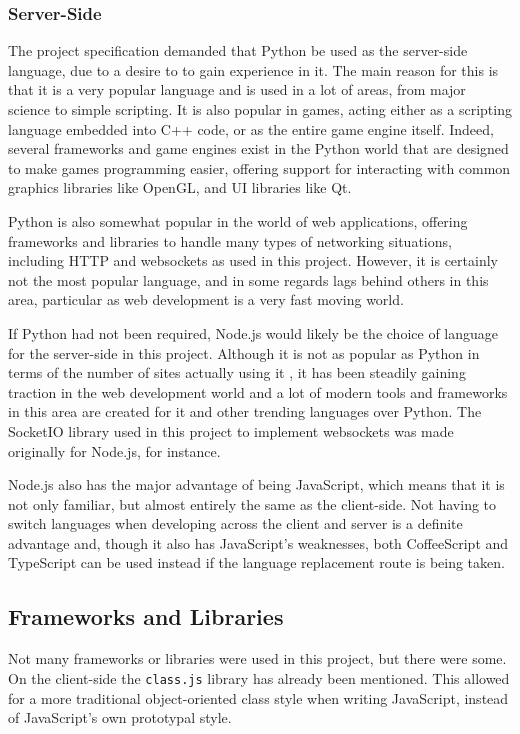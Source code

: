 \subsubsection{Server-Side}
The project specification demanded that Python be used as the server-side language, due to a desire to to gain experience in it. The main reason for this is that it is a very popular language and is used in a lot of areas, from major science to simple scripting. It is also popular in games, acting either as a scripting language embedded into C++ code, or as the entire game engine itself. Indeed, several frameworks and game engines exist in the Python world that are designed to make games programming easier\cite{citeulike:13160372}, offering support for interacting with common graphics libraries like OpenGL, and UI libraries like Qt\cite{citeulike:13160375}.

Python is also somewhat popular in the world of web applications, offering frameworks and libraries to handle many types of networking situations, including HTTP and websockets as used in this project. However, it is certainly not the most popular language, and in some regards lags behind others in this area, particular as web development is a very fast moving world.

If Python had not been required, Node.js would likely be the choice of language for the server-side in this project. Although it is not as popular as Python in terms of the number of sites actually using it \cite{citeulike:13160383}, it has been steadily gaining traction in the web development world and a lot of modern tools and frameworks in this area are created for it and other trending languages over Python. The SocketIO library used in this project to implement websockets was made originally for Node.js, for instance.

Node.js also has the major advantage of being JavaScript, which means that it is not only familiar, but almost entirely the same as the client-side. Not having to switch languages when developing across the client and server is a definite advantage and, though it also has JavaScript's weaknesses, both CoffeeScript and TypeScript can be used instead if the language replacement route is being taken.

\subsection{Frameworks and Libraries}
Not many frameworks or libraries were used in this project, but there were some. On the client-side the \texttt{class.js} library \cite{citeulike:13160361} has already been mentioned. This allowed for a more traditional object-oriented class style when writing JavaScript, instead of JavaScript's own prototypal style.

